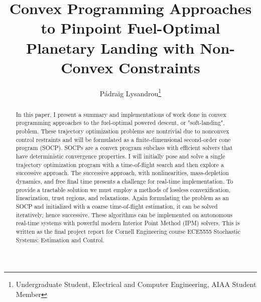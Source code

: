 \documentclass[journal]{new-aiaa}
\title{Convex Programming Approaches to Pinpoint Fuel-Optimal Planetary Landing with Non-Convex Constraints}
\author{Pádraig Lysandrou\footnote{Undergraduate Student, Electrical and Computer Engineering, AIAA Student Member}}
\affil{Cornell University, Ithaca, New York, 14853}
\begin{document}
\maketitle

\begin{singlespace}

\begin{abstract}
In this paper, I present a summary and implementations of work done in convex programming approaches \cite{ploen2007}\cite{enhancements2008}\cite{becet2016}\cite{blackmore2013} to the fuel-optimal powered descent, or "soft-landing", problem. These trajectory optimization problems are nontrivial due to nonconvex control restraints and will be formulated as a finite-dimensional second-order cone program (SOCP). SOCPs are a convex program subclass with efficient solvers that have deterministic convergence properties. I will initially pose and solve a single trajectory optimization program with a time-of-flight search and then explore a successive approach. The successive approach, with nonlinearities, mass-depletion dynamics, and free final time presents a challenge for real-time implementation. To provide a tractable solution we must employ a methods of lossless convexification, linearization, trust regions, and relaxations. Again formulating the problem as an SOCP and initialized with a coarse time-of-flight estimation, it can be solved iteratively, hence successive. These algorithms can be implemented on autonomous real-time systems with powerful modern Interior Point Method (IPM) solvers. This is written as the final project report for Cornell Engineering course ECE5555 Stochastic Systems: Estimation and Control.


\end{abstract}


\end{singlespace}
\end{document}
